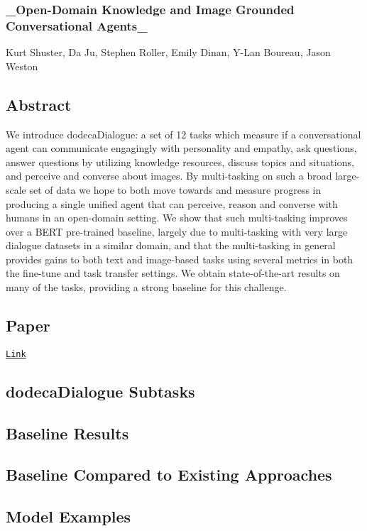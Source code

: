 \subsubsection*{\+\_\+\+Open-\/\+Domain Knowledge and Image Grounded Conversational Agents\+\_\+}

Kurt Shuster, Da Ju, Stephen Roller, Emily Dinan, Y-\/\+Lan Boureau, Jason Weston

\subsection*{Abstract}

We introduce dodeca\+Dialogue\+: a set of 12 tasks which measure if a conversational agent can communicate engagingly with personality and empathy, ask questions, answer questions by utilizing knowledge resources, discuss topics and situations, and perceive and converse about images. By multi-\/tasking on such a broad large-\/scale set of data we hope to both move towards and measure progress in producing a single unified agent that can perceive, reason and converse with humans in an open-\/domain setting. We show that such multi-\/tasking improves over a B\+E\+RT pre-\/trained baseline, largely due to multi-\/tasking with very large dialogue datasets in a similar domain, and that the multi-\/tasking in general provides gains to both text and image-\/based tasks using several metrics in both the fine-\/tune and task transfer settings. We obtain state-\/of-\/the-\/art results on many of the tasks, providing a strong baseline for this challenge.

\subsection*{Paper}

\href{https://drive.google.com/open?id=1WFf5hqMdjJ9MaCU76lCUwNm5G6wWiX6y}{\tt Link}

\subsection*{dodeca\+Dialogue Subtasks}



\subsection*{Baseline Results}



\subsection*{Baseline Compared to Existing Approaches}



\subsection*{Model Examples}



